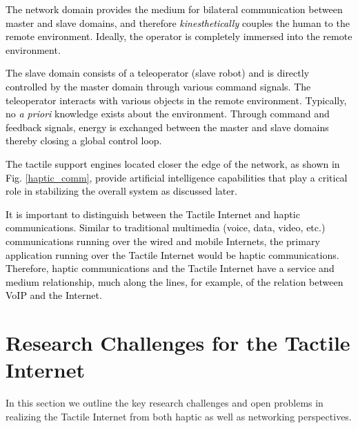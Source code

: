 \documentclass[journal]{IEEEtran}
\begin{document}
\textcolor{black}{The network domain provides the medium for bilateral communication between master and slave domains, and therefore \emph{kinesthetically} couples the human to the remote environment. Ideally, the operator is completely immersed into the remote environment.}

\textcolor{black}{The slave domain consists of a teleoperator (slave robot) and is directly controlled by the master domain through various command signals. The teleoperator interacts with various objects in the remote environment. Typically, no \emph{a priori} knowledge exists about the environment. Through command and feedback signals, energy is exchanged between the master and slave domains thereby closing a global control loop.}

\textcolor{black}{The tactile support engines located closer the edge of the network, as shown in Fig.  \ref{haptic_comm}, provide artificial intelligence capabilities that play a critical role in stabilizing the overall system as discussed later. }

\textcolor{black}{It is important to distinguish between the Tactile Internet and haptic communications. Similar to traditional multimedia (voice, data, video, etc.) communications running over the wired and mobile Internets, the primary application running over the Tactile Internet would be haptic communications. Therefore, haptic communications and the Tactile Internet have a service and medium relationship, much along the lines, for example, of the relation between VoIP and the Internet.}







\section{Research Challenges for the Tactile Internet}
In this section we outline the key research challenges and open problems in realizing the Tactile Internet from both haptic as well as networking perspectives.
\end{document}
